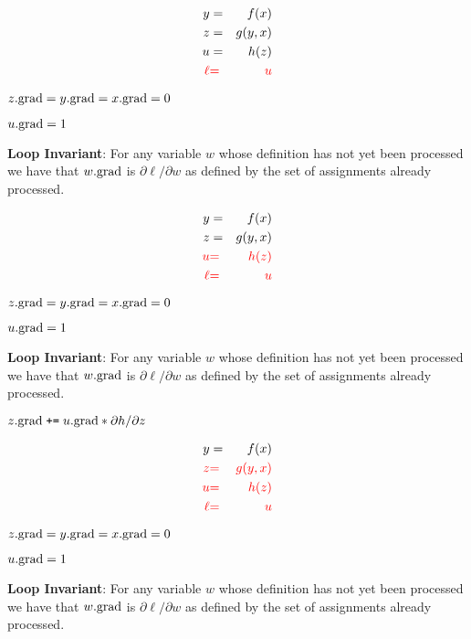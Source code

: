 {
\vspace{-3ex}
\begin{eqnarray*}
  y & = & f(x) \\
  z & = & g(y,x) \\
  u & = & h(z) \\
  {\color{red} \ell} &  {\color{red} =} & {\color{red}  u}
\end{eqnarray*}


\medskip
$z.\mathrm{grad} = y.\mathrm{grad} = x.\mathrm{grad} = 0$

\medskip
$u.\mathrm{grad} = 1$

\medskip
{\bf Loop Invariant}: For any variable $w$ whose definition has not yet been processed we have that $w.\mathrm{grad}$ is $\partial \ell/\partial w$ as defined by the set of assignments already processed.

\vspace{-3ex}
\begin{eqnarray*}
  y & = & f(x) \\
  z & = & g(y,x) \\
  {\color{red} u} & {\color{red} =} & {\color{red} h(z)} \\
  {\color{red} \ell} & {\color{red}  =} &  {\color{red} u}
\end{eqnarray*}

\medskip
$z.\mathrm{grad} = y.\mathrm{grad} = x.\mathrm{grad} = 0$

\medskip
$u.\mathrm{grad} = 1$

\medskip
{\bf Loop Invariant}: For any variable $w$ whose definition has not yet been processed we have that $w.\mathrm{grad}$ is $\partial \ell/\partial w$ as defined by the set of assignments already processed.

\medskip
$z.\mathrm{grad}\;\mbox{\tt +=}\; u.\mathrm{grad} * {\partial h}/{\partial z}$

\vspace{-3ex}
\begin{eqnarray*}
  y & = & f(x) \\
  {\color{red} z} & {\color{red} =} & {\color{red} g(y,x)} \\
  {\color{red} u} & {\color{red} =} & {\color{red} h(z)} \\
  {\color{red} \ell} & {\color{red} =} & {\color{red}  u}
\end{eqnarray*}

\medskip
$z.\mathrm{grad} = y.\mathrm{grad} = x.\mathrm{grad} = 0$

\medskip
$u.\mathrm{grad} = 1$

\medskip
    {\bf Loop Invariant}: For any variable $w$ whose definition has not yet been processed we have that $w.\mathrm{grad}$ is $\partial \ell/\partial w$ as defined by the set of assignments already processed.

}
